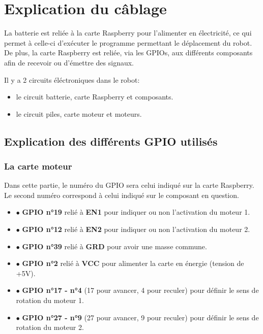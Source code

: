 \newpage
\section{Explication du câblage}
 
La batterie est reliée à la carte Raspberry pour l'alimenter en électricité, ce qui permet à celle-ci d'exécuter le programme permettant le déplacement du robot.
De plus, la carte Raspberry est reliée, via les GPIOs, aux différents composants afin de recevoir ou d'émettre des signaux.

Il y a 2 circuits éléctroniques dans le robot:
\begin{itemize}
        \item le circuit batterie, carte Raspberry et composants.
        \item le circuit piles, carte moteur et moteurs.
\end{itemize}
\subsection{Explication des différents GPIO utilisés}
        \subsubsection{La carte moteur}
        Dans cette partie, le numéro du GPIO sera celui indiqué sur la carte Raspberry. Le second numéro correspond à celui indiqué sur le composant en question. 
	        \begin{itemize}
                \item $\bullet$ \textbf{GPIO n°19} relié à \textbf{EN1} pour indiquer ou non l'activation du moteur 1.
                \item $\bullet$ \textbf{GPIO n°12} relié à \textbf{EN2} pour indiquer ou non l'activation du moteur 2.
                \item $\bullet$ \textbf{GPIO n°39} relié à \textbf{GRD} pour avoir une masse commune.
                \item $\bullet$ \textbf{GPIO n°2} relié à \textbf{VCC} pour alimenter la carte en énergie (tension de +5V).
                \item $\bullet$ \textbf{GPIO n°17 - n°4} (17 pour avancer, 4 pour reculer) pour définir le sens de rotation du moteur 1.
                \item $\bullet$ \textbf{GPIO n°27 - n°9} (27 pour avancer, 9 pour reculer) pour définir le sens de rotation du moteur 2.
                \end{itemize}
